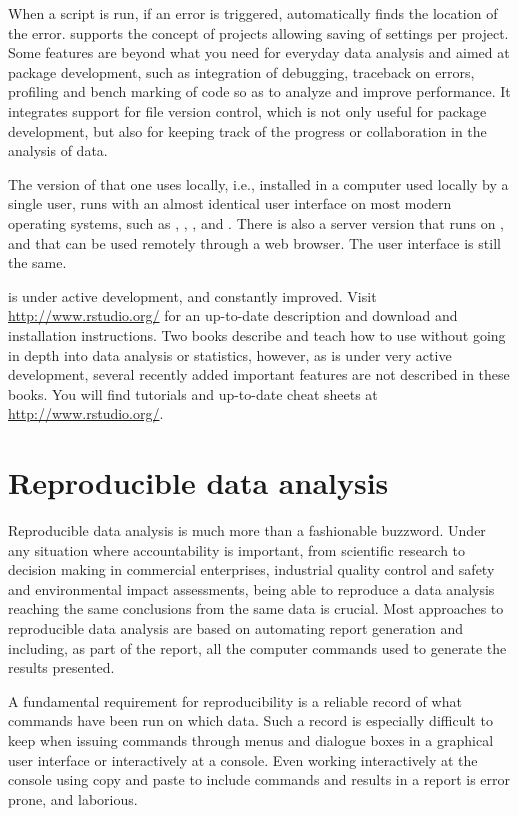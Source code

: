\documentclass[krantz2]{krantz}\usepackage{knitr}
\begin{document}
When a script is run, if an error is triggered, \RStudio automatically finds the location of the error. \RStudio supports the concept of projects allowing saving of settings per project. Some features are beyond what you need for everyday data analysis and aimed at package development, such as integration of debugging, traceback on errors, profiling and bench marking of code so as to analyze and improve performance. It integrates support for file version control, which is not only useful for package development, but also for keeping track of the progress or collaboration in the analysis of data.

The version of \RStudio that one uses locally, i.e., installed in a computer used locally by a single user, runs with an almost identical user interface on most modern operating systems, such as , , , and . There is also a server version that runs on , and that can be used remotely through a web browser. The user interface is still the same.

\RStudio is under active development, and constantly improved. Visit \url{http://www.rstudio.org/} for an up-to-date description and download and installation instructions. Two books \autocite{vanderLoo2012,Hillebrand2015} describe and teach how to use \RStudio without going in depth into data analysis or statistics, however, as \RStudio is under very active development, several recently added important features are not described in these books. You will find tutorials and up-to-date cheat sheets at \url{http://www.rstudio.org/}.

\section{Reproducible data analysis}
Reproducible data analysis is much more than a fashionable buzzword. Under any situation where accountability is important, from scientific research to decision making in commercial enterprises, industrial quality control and safety and environmental impact assessments, being able to reproduce a data analysis reaching the same conclusions from the same data is crucial. Most approaches to reproducible data analysis are based on automating report generation and including, as part of the report, all the computer commands used to generate the results presented.

A fundamental requirement for reproducibility is a reliable record of what commands have been run on which data. Such a record is especially difficult to keep when issuing commands through menus and dialogue boxes in a graphical user interface or interactively at a console. Even working interactively at the \Rpgrm console using copy and paste to include commands and results in a report is error prone, and laborious.
\end{document}
